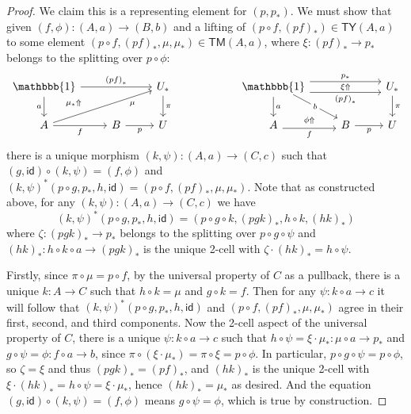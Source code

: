 \documentclass[10pt]{article}
\theoremstyle{definition}
\newcommand{\id}{\mathsf{id}}
\newcommand\Cty{\mathsf{TY}}
\newcommand\Ctm{\mathsf{TM}}
\newcommand\one{\mathbbb{1}}
\newcommand\Un{U}
\newcommand\Ub{U_*}
\newcommand\pb{p_*}
\newcommand\mub{\mu_*}
\newcommand\bb[1]{{(#1)}_*}
\begin{document}
\begin{proof}
  We claim this is a representing element for $(p,\pb)$.
  We must show that given $(f,\phi):(A,a)\to (B,b)$ and a lifting of $(p\circ f, \bb{pf}) \in \Cty(A,a)$ to some element $(p\circ f, \bb{pf},\mu,\mub) \in \Ctm(A,a)$, where $\xi:\bb{pf} \to \pb$ belongs to the splitting over $p\circ \phi$:
  \[
    \begin{tikzcd}
      \one \ar[d,"a"'] \ar[rr,"\bb{pf}"] \ar[dr,phantom,near start,"\scriptstyle\mub\Uparrow"] && \Ub \ar[d,"\pi"] \\
      A \ar[r,"f"'] \ar[urr,near end,"\mu"'] & B \ar[r,"p"'] & \Un
    \end{tikzcd}
    \hspace{2cm}
    \begin{tikzcd}
      \one \ar[d,"a"] \ar[dr,shift left,"b" description] \ar[rr,shift right=2,"\bb{pf}"'] \ar[rr,shift left=2,"\pb"] \ar[rr,phantom,"\scriptstyle\xi\Uparrow"] && \Ub \ar[d,"\pi"] \\
      A \ar[r,shift right,"f"']  \ar[r,phantom,shift left=2,"\scriptstyle\phi\Uparrow"] & B \ar[r,"p"'] & \Un
    \end{tikzcd}
  \]
  there is a unique morphism $(k,\psi) : (A,a) \to (C,c)$ such that $(g,\id) \circ (k,\psi) = (f,\phi)$ and $(k,\psi)^*(p\circ g, \pb, h, \id) = (p\circ f, \bb{pf},\mu,\mub)$.
  Note that as constructed above, for any $(k,\psi) : (A,a) \to (C,c)$ we have
  \[(k,\psi)^*(p\circ g, \pb, h, \id) = (p\circ g\circ k, \bb{pgk}, h\circ k, \bb{hk})\]
  where $\zeta:\bb{pgk} \to \pb$ belongs to the splitting over $p\circ g\circ \psi$ and $\bb{hk}:h\circ k \circ a \to \bb{pgk}$ is the unique 2-cell with $\zeta \cdot \bb{hk} = h\circ \psi$.

  Firstly, since $\pi \circ \mu = p\circ f$, by the universal property of $C$ as a pullback, there is a unique $k:A\to C$ such that $h\circ k = \mu$ and $g\circ k = f$.
  Then for any $\psi:k\circ a \to c$ it will follow that $(k,\psi)^*(p\circ g, \pb, h, \id)$ and $(p\circ f, \bb{pf},\mu,\mub)$ agree in their first, second, and third components.
  Now the 2-cell aspect of the universal property of $C$, there is a unique $\psi : k\circ a \to c$ such that $h\circ \psi = \xi\cdot \mub : \mu\circ a \to \pb$ and $g\circ \psi = \phi : f \circ a \to b$, since $\pi\circ (\xi\cdot \mub) = \pi\circ \xi = p\circ \phi$.
  In particular, $p\circ g\circ \psi = p\circ \phi$, so $\zeta = \xi$ and thus $\bb{pgk} = \bb{pf}$, and $\bb{hk}$ is the unique 2-cell with $\xi \cdot \bb{hk} = h\circ \psi = \xi\cdot\mub$, hence $\bb{hk} = \mub$ as desired.
  And the equation $(g,\id) \circ (k,\psi) = (f,\phi)$ means $g\circ \psi = \phi$, which is true by construction.


\end{proof}
\end{document}
